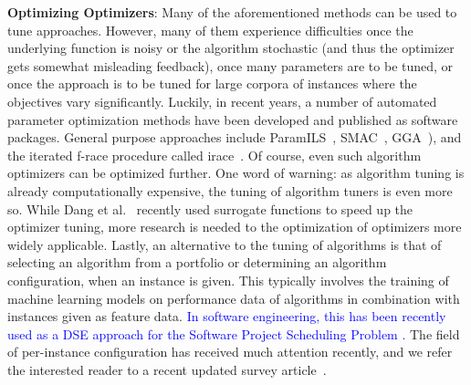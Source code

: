 \documentclass[sigconf,anonymous,review]{acmart}
\newcommand\llm[1]{\textcolor{blue}{#1\xspace}}
\begin{document}
\noindent\textbf{Optimizing Optimizers}: %
Many of the aforementioned methods can be used to tune approaches. However, many of them experience difficulties once the underlying function is noisy or the algorithm stochastic (and thus the optimizer gets somewhat misleading feedback), once many parameters are to be tuned, or once the approach is to be tuned for large corpora of instances where the objectives vary significantly. Luckily, in recent years, a number of automated parameter optimization methods have been developed and published as software packages. General purpose approaches include ParamILS~\cite{hutter2007paramils}, SMAC~\cite{hutter2011smac}, GGA~\cite{ansotegui2009gga}), and the iterated f-race procedure called irace~\cite{birattari2002irace}. %
Of course, even such algorithm optimizers can be optimized further. One word of warning: as algorithm tuning is already computationally expensive, the tuning of algorithm tuners is even more so. While Dang et al.~\cite{dang2017iraceconfig} recently used surrogate functions to speed up the optimizer tuning, more research is needed to the optimization of optimizers more widely applicable. Lastly, an alternative to the tuning of algorithms is that of selecting an algorithm from a portfolio or determining an algorithm configuration, when an instance is given. This typically involves the training of machine learning models on performance data of algorithms in combination with instances given as feature data. \llm{In software engineering, this has been recently used as a DSE approach for the Software Project Scheduling Problem \cite{Shen2018,wu2016}.} The field of per-instance configuration has received much attention recently, and we refer the interested reader to a recent updated survey article~\cite{kotthoff2016survey}. 
\end{document}
